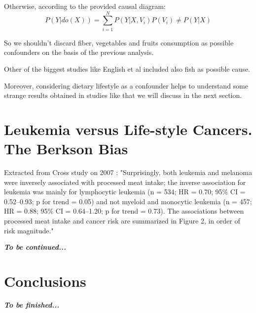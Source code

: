 \documentclass{article}
\begin{document}
Otherwise, according to the provided causal diagram:
\begin{equation}
P(Y|do(X))=\sum _{i=1}^{N} P(Y|X,V_i)P(V_i) \neq P (Y|X)
\end{equation}


So we shouldn't discard fiber, vegetables and fruits consumption as possible confounders on the basis of the previous analysis.

Other of the biggest studies like English et al \cite{english} included also fish as possible cause.

Moreover, considering dietary lifestyle as a confounder helps to understand some strange results obtained in studies like \cite{cross} that we will discuss in the next section.

\section{Leukemia versus Life-style Cancers. The Berkson Bias}

Extracted from Cross study on 2007 \cite{cross}: "Surprisingly, both leukemia and melanoma were inversely associated with processed meat intake; the inverse association for leukemia was mainly for lymphocytic leukemia (n = 534; HR = 0.70; 95\% CI = 0.52–0.93; p for trend = 0.05) and not myeloid and monocytic leukemia (n = 457; HR = 0.88; 95\% CI = 0.64–1.20; p for trend = 0.73). The associations between processed meat intake and cancer risk are summarized in Figure 2, in order of risk magnitude."

\textbf{\textit{To be continued...}}

\section{Conclusions}

\textbf{\textit{To be finished...}}



\end{document}
